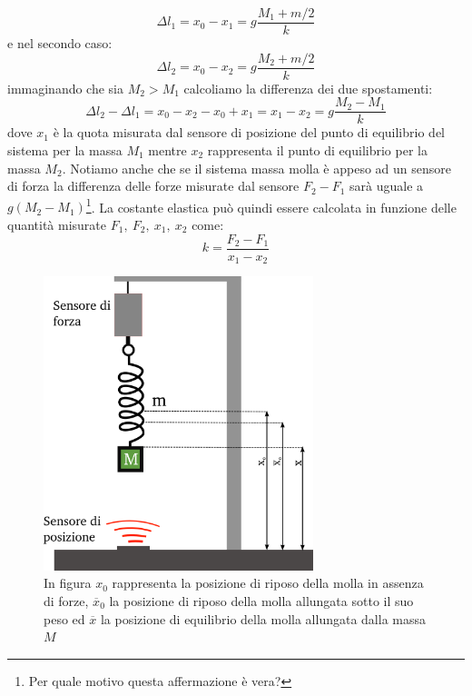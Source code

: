 \documentclass[a4paper,10pt,oneside]{article}
\begin{document}
\begin{equation}
 \Delta l_1=x_0-x_1=g\frac{M_1+m/2}{k}
\end{equation}
e nel secondo caso:
\begin{equation}
 \Delta l_2=x_0-x_2=g\frac{M_2+m/2}{k}
\end{equation}
immaginando che sia $M_2>M_1$ calcoliamo la differenza dei due spostamenti:
\begin{equation}
 \Delta l_2-\Delta l_1=x_0-x_2-x_0+x_1=x_1-x_2=g\frac{M_2-M_1}{k}
\end{equation}
dove $x_1$ è la quota misurata dal sensore di posizione del punto di equilibrio del sistema per la massa $M_1$ mentre $x_2$ rappresenta il punto di equilibrio per la massa $M_2$. Notiamo anche che se il sistema massa molla è appeso ad un sensore di forza la differenza delle forze misurate dal sensore $F_2-F_1$ sarà uguale a $g(M_2-M_1)$\footnote{Per quale motivo questa affermazione è vera?}. La costante elastica può quindi essere calcolata in funzione delle quantità misurate $F_1,\ F_2,\ x_1,\ x_2$ come:
\begin{equation}
 k=\frac{F_2-F_1}{x_1-x_2}
\end{equation}


\begin{figure}[H]
 \centering
 \includegraphics[width=0.7\textwidth]{./Immagini/pendolo_elastica.png}
\caption{In figura $x_0$ rappresenta la posizione di riposo della molla in assenza di forze, $\overline{x}_0$ la posizione di riposo della molla allungata sotto il suo peso ed $\overline x$ la posizione di equilibrio della molla allungata dalla massa $M$} \label{fig:pendolo_reale}
\end{figure}
\end{document}
